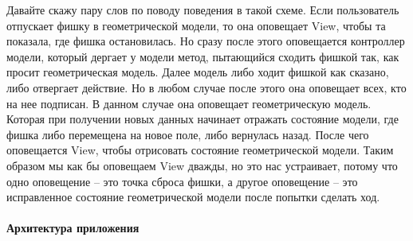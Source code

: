 Давайте скажу пару слов по поводу поведения в такой схеме.
Если пользователь отпускает фишку в геометрической модели, то она оповещает View, чтобы та показала, где фишка остановилась.
Но сразу после этого оповещается контроллер модели, который дергает у модели метод, пытающийся сходить фишкой так, как просит геометрическая модель.
Далее модель либо ходит фишкой как сказано, либо отвергает действие.
Но в любом случае после этого она оповещает всех, кто на нее подписан.
В данном случае она оповещает геометрическую модель.
Которая при получении новых данных начинает отражать состояние модели, где фишка либо перемещена на новое поле, либо вернулась назад.
После чего оповещается View, чтобы отрисовать состояние геометрической модели.
Таким образом мы как бы оповещаем View дважды, но это нас устраивает, потому что одно оповещение -- это точка сброса фишки, а другое оповещение -- это исправленное состояние геометрической модели после попытки сделать ход.

\paragraph{Архитектура приложения}

